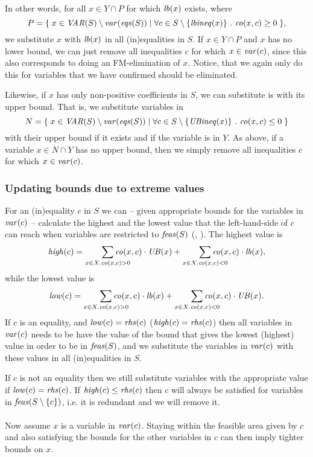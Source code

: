 In other words, for all $x\in Y\cap P$ for which $\mathit{lb}(x)$ exists, where 
\[
P=\{\;{x\in \mathit{VAR}(S)\setminus \mathit{var}(\mathit{eqs}(S))}\;|\;{\forall c\in S\setminus\{\mathit{lbineq}(x)\}\ .\ \mathit{co}(x,c)\geq 0}\;\},
\] 
we substitute $x$ with $\mathit{lb}(x)$ in all (in)equalities in $S$. If $x\in Y\cap P$ and $x$ has no lower bound, we can just remove all inequalities $c$ for which $x\in \mathit{var}(c)$, since this also corresponds to doing an FM-elimination of $x$. 
Notice, that we again only do this for variables that we have confirmed should be eliminated. 
	
Likewise, if $x$ has only non-positive coefficients in $S$, we can substitute is with its upper bound. That is, we substitute variables in 
\[
N=\set {x\in \VAR(S)\setminus\var(\eqs(S))}{\forall c\in S\setminus\{\UBc(x)\}\ . \ \coef(x,c)\leq 0}
\] 
with their upper bound if it exists and if the variable is in $Y$. As above, if a variable $x\in N\cap Y$ has no upper bound, then we simply remove all inequalities $c$ for which $x\in \mathit{var}(c)$.
%	
\subsubsection{Updating bounds due to extreme values} For an (in)equality $c$ in $S$ we can -- given appropriate bounds for the variables in $\mathit{var}(c)$ -- calculate the highest and the lowest value that the left-hand-side of $c$ can reach when variables are restricted to $\mathit{feas}(S)$ (\cite{maros}, {\cite{andersen95}}). The highest value is
	\begin{equation}\label{eq:high}
	\mathit{high}(c)=\smashoperator[r]{\sum_{x\in X.\coef(x,c)>0}}\coef(x,c)\cdot\UB(x) + \smashoperator[r]{\sum_{x\in X.\coef(x,c)<0}}\coef(x,c)\cdot\lb(x),
	\end{equation}
	while the lowest value is
	\begin{equation}\label{eq:low}
	\mathit{low}(c)=\smashoperator[r]{\sum_{x\in X.\coef(x,c)>0}}\coef(x,c)\cdot\lb(x) + \smashoperator[r]{\sum_{x\in X.\coef(x,c)<0}}\coef(x,c)\cdot\UB(x).
	\end{equation}
If $c$ is an equality, and  
$\mathit{low}(c) = \mathit{rhs}(c)$ ($\mathit{high}(c) = \mathit{rhs}(c)$) then all variables in $\mathit{var}(c)$ needs to be have the value of the bound that gives the lowest (highest) value in order to be in $\mathit{feas}(S)$, and we substitute the variables in $\mathit{var}(c)$ with these values in all (in)equalities in $S$.

If $c$ is not an equality then we still substitute variables with the appropriate value if $\mathit{low}(c) = \mathit{rhs}(c)$.   
If $\mathit{high}(c)\leq\mathit{rhs}(c)$ then $c$ will always be satisfied for variables in $\mathit{feas}(S\setminus\{c\})$, i.e. it is redundant and we will remove it. 
\\\\
Now assume $x$ is a variable in $\mathit{var}(c)$. 
{Staying within the feasible area given by $c$ and also satisfying the bounds for the other variables in $c$ can then imply tighter bounds on $x$.}

